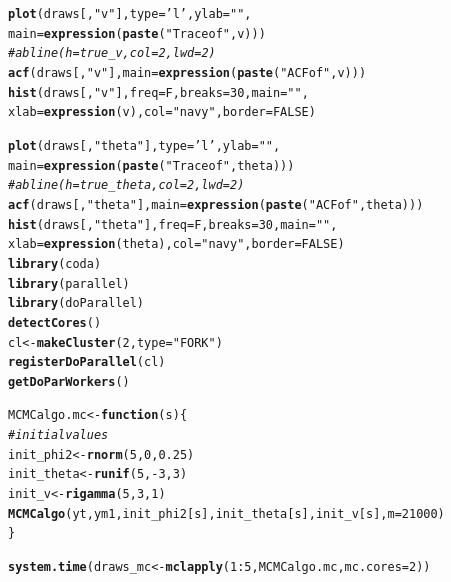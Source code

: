 \documentclass[12pt]{article}\usepackage[]{graphicx}\usepackage[]{color}
\makeatletter
\newcommand{\hlnum}[1]{\textcolor[rgb]{0.686,0.059,0.569}{#1}}%
\newcommand{\hlstr}[1]{\textcolor[rgb]{0.192,0.494,0.8}{#1}}%
\newcommand{\hlcom}[1]{\textcolor[rgb]{0.678,0.584,0.686}{\textit{#1}}}%
\newcommand{\hlopt}[1]{\textcolor[rgb]{0,0,0}{#1}}%
\newcommand{\hlstd}[1]{\textcolor[rgb]{0.345,0.345,0.345}{#1}}%
\newcommand{\hlkwa}[1]{\textcolor[rgb]{0.161,0.373,0.58}{\textbf{#1}}}%
\newcommand{\hlkwb}[1]{\textcolor[rgb]{0.69,0.353,0.396}{#1}}%
\newcommand{\hlkwc}[1]{\textcolor[rgb]{0.333,0.667,0.333}{#1}}%
\newcommand{\hlkwd}[1]{\textcolor[rgb]{0.737,0.353,0.396}{\textbf{#1}}}%
\newenvironment{kframe}{%
 \def\at@end@of@kframe{}%
 \ifinner\ifhmode%
  \def\at@end@of@kframe{\end{minipage}}%
  \begin{minipage}{\columnwidth}%
 \fi\fi%
 \def\FrameCommand##1{\hskip\@totalleftmargin \hskip-\fboxsep
 \colorbox{shadecolor}{##1}\hskip-\fboxsep
     \hskip-\linewidth \hskip-\@totalleftmargin \hskip\columnwidth}%
 \MakeFramed {\advance\hsize-\width
   \@totalleftmargin\z@ \linewidth\hsize
   \@setminipage}}%
 {\par\unskip\endMakeFramed%
 \at@end@of@kframe}
\newenvironment{knitrout}{}{} %
\makeatother
\begin{document}
\begin{knitrout}
\begin{kframe}
\begin{alltt}
\hlkwd{plot}\hlstd{(draws[,} \hlstr{"v"}\hlstd{],} \hlkwc{type} \hlstd{=} \hlstr{'l'}\hlstd{,} \hlkwc{ylab} \hlstd{=} \hlstr{""}\hlstd{,}
     \hlkwc{main} \hlstd{=} \hlkwd{expression}\hlstd{(}\hlkwd{paste}\hlstd{(}\hlstr{"Trace of "}\hlstd{, v)))}
\hlcom{# abline(h = true_v, col = 2, lwd = 2)}
\hlkwd{acf}\hlstd{(draws[,} \hlstr{"v"}\hlstd{],} \hlkwc{main} \hlstd{=} \hlkwd{expression}\hlstd{(}\hlkwd{paste}\hlstd{(}\hlstr{"ACF of "}\hlstd{, v)))}
\hlkwd{hist}\hlstd{(draws[,} \hlstr{"v"}\hlstd{],} \hlkwc{freq} \hlstd{= F,} \hlkwc{breaks} \hlstd{=} \hlnum{30}\hlstd{,} \hlkwc{main} \hlstd{=} \hlstr{""}\hlstd{,}
     \hlkwc{xlab} \hlstd{=} \hlkwd{expression}\hlstd{(v),} \hlkwc{col} \hlstd{=} \hlstr{"navy"}\hlstd{,} \hlkwc{border} \hlstd{=} \hlnum{FALSE}\hlstd{)}

\hlkwd{plot}\hlstd{(draws[,} \hlstr{"theta"}\hlstd{],} \hlkwc{type} \hlstd{=} \hlstr{'l'}\hlstd{,} \hlkwc{ylab} \hlstd{=} \hlstr{""}\hlstd{,}
     \hlkwc{main} \hlstd{=} \hlkwd{expression}\hlstd{(}\hlkwd{paste}\hlstd{(}\hlstr{"Trace of "}\hlstd{, theta)))}
\hlcom{# abline(h = true_theta, col = 2, lwd = 2)}
\hlkwd{acf}\hlstd{(draws[,} \hlstr{"theta"}\hlstd{],} \hlkwc{main} \hlstd{=} \hlkwd{expression}\hlstd{(}\hlkwd{paste}\hlstd{(}\hlstr{"ACF of "}\hlstd{, theta)))}
\hlkwd{hist}\hlstd{(draws[,} \hlstr{"theta"}\hlstd{],} \hlkwc{freq} \hlstd{= F,} \hlkwc{breaks} \hlstd{=} \hlnum{30}\hlstd{,} \hlkwc{main} \hlstd{=} \hlstr{""}\hlstd{,}
     \hlkwc{xlab} \hlstd{=} \hlkwd{expression}\hlstd{(theta),} \hlkwc{col} \hlstd{=} \hlstr{"navy"}\hlstd{,} \hlkwc{border} \hlstd{=} \hlnum{FALSE}\hlstd{)}
\hlkwd{library}\hlstd{(coda)}
\hlkwd{library}\hlstd{(parallel)}
\hlkwd{library}\hlstd{(doParallel)}
\hlkwd{detectCores}\hlstd{()}
\hlstd{cl} \hlkwb{<-} \hlkwd{makeCluster}\hlstd{(}\hlnum{2}\hlstd{,} \hlkwc{type} \hlstd{=} \hlstr{"FORK"}\hlstd{)}
\hlkwd{registerDoParallel}\hlstd{(cl)}
\hlkwd{getDoParWorkers}\hlstd{()}

\hlstd{MCMCalgo.mc} \hlkwb{<-} \hlkwa{function}\hlstd{(}\hlkwc{s}\hlstd{) \{}
    \hlcom{# initial values}
    \hlstd{init_phi2} \hlkwb{<-} \hlkwd{rnorm}\hlstd{(}\hlnum{5}\hlstd{,} \hlnum{0}\hlstd{,} \hlnum{0.25}\hlstd{)}
    \hlstd{init_theta} \hlkwb{<-} \hlkwd{runif}\hlstd{(}\hlnum{5}\hlstd{,} \hlopt{-}\hlnum{3}\hlstd{,} \hlnum{3}\hlstd{)}
    \hlstd{init_v} \hlkwb{<-} \hlkwd{rigamma}\hlstd{(}\hlnum{5}\hlstd{,} \hlnum{3}\hlstd{,} \hlnum{1}\hlstd{)}
    \hlkwd{MCMCalgo}\hlstd{(yt, ym1, init_phi2[s], init_theta[s], init_v[s],} \hlkwc{m} \hlstd{=} \hlnum{21000}\hlstd{)}
\hlstd{\}}

\hlkwd{system.time}\hlstd{(draws_mc} \hlkwb{<-} \hlkwd{mclapply}\hlstd{(}\hlnum{1}\hlopt{:}\hlnum{5}\hlstd{, MCMCalgo.mc,} \hlkwc{mc.cores} \hlstd{=} \hlnum{2}\hlstd{))}


\end{alltt}
\end{kframe}
\end{knitrout}
\end{document}
